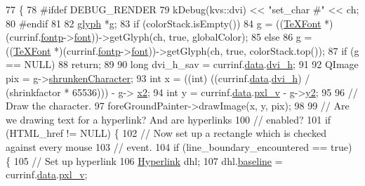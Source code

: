 \begin{DoxyCode}
77 \{
78 \textcolor{preprocessor}{#ifdef DEBUG\_RENDER}
79   kDebug(kvs::dvi) << \textcolor{stringliteral}{"set\_char #"} << ch;
80 \textcolor{preprocessor}{#endif}
81 
82   \hyperlink{classglyph}{glyph} *g;
83   \textcolor{keywordflow}{if} (colorStack.isEmpty())
84     g = ((\hyperlink{classTeXFont}{TeXFont} *)(currinf.\hyperlink{structdrawinf_a4a6ec248b5b071099ddf9b5e4f0255e2}{fontp}->\hyperlink{classTeXFontDefinition_a3e788e09d8978795672226b472163b4f}{font}))->getGlyph(ch, \textcolor{keyword}{true}, globalColor);
85   \textcolor{keywordflow}{else}
86     g = ((\hyperlink{classTeXFont}{TeXFont} *)(currinf.\hyperlink{structdrawinf_a4a6ec248b5b071099ddf9b5e4f0255e2}{fontp}->\hyperlink{classTeXFontDefinition_a3e788e09d8978795672226b472163b4f}{font}))->getGlyph(ch, \textcolor{keyword}{true}, colorStack.top());
87   \textcolor{keywordflow}{if} (g == NULL)
88     \textcolor{keywordflow}{return};
89 
90   \textcolor{keywordtype}{long} dvi\_h\_sav = currinf.\hyperlink{structdrawinf_af73f66288002f0a25c7843a534bf1340}{data}.\hyperlink{structframedata_a530699c241126f99b81cee11c2c1c4e4}{dvi\_h};
91 
92   QImage pix = g->\hyperlink{classglyph_aeefa28a926bdd7a24595dbdc7cdf504c}{shrunkenCharacter};
93   \textcolor{keywordtype}{int} x = ((int) ((currinf.\hyperlink{structdrawinf_af73f66288002f0a25c7843a534bf1340}{data}.\hyperlink{structframedata_a530699c241126f99b81cee11c2c1c4e4}{dvi\_h}) / (shrinkfactor * 65536))) - g->
      \hyperlink{classglyph_a07a7aa840a9a34588a5cc02508ac5e6d}{x2};
94   \textcolor{keywordtype}{int} y = currinf.\hyperlink{structdrawinf_af73f66288002f0a25c7843a534bf1340}{data}.\hyperlink{structframedata_a0e7316fa88b0240baa7ce526650131a9}{pxl\_v} - g->\hyperlink{classglyph_afa1607f13eb1db99a5a3b1c92d47db7f}{y2};
95 
96   \textcolor{comment}{// Draw the character.}
97   foreGroundPainter->drawImage(x, y, pix);
98 
99   \textcolor{comment}{// Are we drawing text for a hyperlink? And are hyperlinks}
100   \textcolor{comment}{// enabled?}
101   \textcolor{keywordflow}{if} (HTML\_href != NULL) \{
102     \textcolor{comment}{// Now set up a rectangle which is checked against every mouse}
103     \textcolor{comment}{// event.}
104     \textcolor{keywordflow}{if} (line\_boundary\_encountered == \textcolor{keyword}{true}) \{
105       \textcolor{comment}{// Set up hyperlink}
106       \hyperlink{classHyperlink}{Hyperlink} dhl;
107       dhl.\hyperlink{classHyperlink_aec2a7167f48623f38d3c628e0ebb298f}{baseline} = currinf.\hyperlink{structdrawinf_af73f66288002f0a25c7843a534bf1340}{data}.\hyperlink{structframedata_a0e7316fa88b0240baa7ce526650131a9}{pxl\_v};

\end{DoxyCode}
